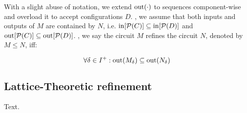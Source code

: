 

With a slight abuse of notation, we extend $\operatorname{out}(\cdot)$ to sequences component-wise and overload it to accept configurations $D$. , we assume that both inputs and outputs of $M$ are contained by $N$, i.e. $\operatorname{in}[\mathcal{P}(C)] \subseteq \operatorname{in}[\mathcal{P}(D)]$ and $\operatorname{out}[\mathcal{P}(C)] \subseteq \operatorname{out}[\mathcal{P}(D)]$. , we say the circuit $M$ refines the circuit $N$, denoted by $M \leq N$, iff:

\begin{equation*}
\forall \delta \in I^{+} : \operatorname{out}(M_{\delta}) \subseteq \operatorname{out}(N_{\delta})
\end{equation*}

\subsection{Lattice-Theoretic refinement}

Text.
